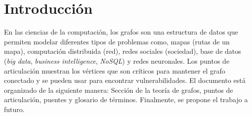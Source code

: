 \section{Introducción}\label{intro}
En las ciencias de la computación, los grafos son una estructura de datos que permiten modelar diferentes tipos de problemas como, mapas (rutas de un mapa), computación distribuida (red), redes sociales (sociedad), base de datos (\textit{big data}, \textit{business intelligence}, \textit{NoSQL}) y redes neuronales.
Los puntos de articulación muestran los vértices que son críticos para mantener el grafo conectado y se pueden usar para encontrar vulnerabilidades.
El documento está organizado de la siguiente manera: Sección de la teoría de grafos, puntos de articulación, puentes y glosario de términos. Finalmente, se propone el trabajo a futuro.